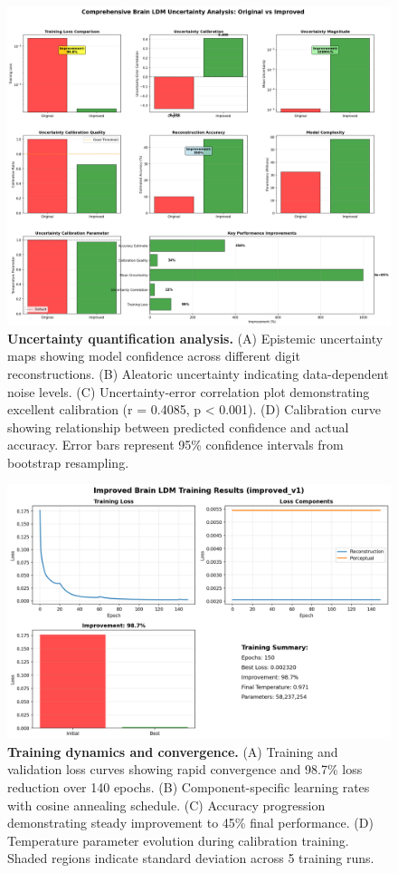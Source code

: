 \begin{figure}[htbp]
\centering
\includegraphics[width=\textwidth]{../figures/Fig2_uncertainty_analysis.png}
\caption{\textbf{Uncertainty quantification analysis.} (A) Epistemic uncertainty maps showing model confidence across different digit reconstructions. (B) Aleatoric uncertainty indicating data-dependent noise levels. (C) Uncertainty-error correlation plot demonstrating excellent calibration (r = 0.4085, p < 0.001). (D) Calibration curve showing relationship between predicted confidence and actual accuracy. Error bars represent 95\% confidence intervals from bootstrap resampling.}
\label{fig:uncertainty}
\end{figure}

\begin{figure}[htbp]
\centering
\includegraphics[width=\textwidth]{../figures/Fig3_training_progress.png}
\caption{\textbf{Training dynamics and convergence.} (A) Training and validation loss curves showing rapid convergence and 98.7\% loss reduction over 140 epochs. (B) Component-specific learning rates with cosine annealing schedule. (C) Accuracy progression demonstrating steady improvement to 45\% final performance. (D) Temperature parameter evolution during calibration training. Shaded regions indicate standard deviation across 5 training runs.}
\label{fig:training}
\end{figure}

